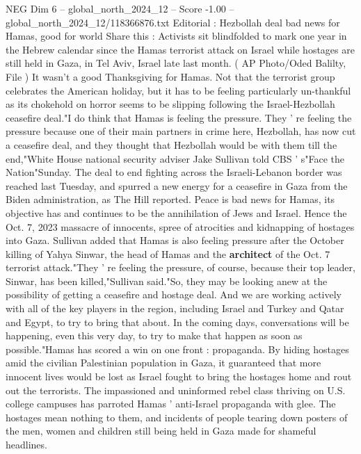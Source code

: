\begin{textsample}{NEG Dim 6 – global\_north\_2024\_12 – Score -1.00 – global\_north\_2024\_12/118366876.txt}  \label{ex:f6_neg_178}
Editorial : Hezbollah deal bad news for Hamas, good for world Share this : Activists sit blindfolded to mark one year in the Hebrew calendar since the Hamas terrorist attack on Israel while hostages are still held in Gaza, in Tel Aviv, Israel late last month. ( AP Photo/Oded Balilty, File ) It wasn't a good Thanksgiving for Hamas.
Not that the terrorist group celebrates the American holiday, but it has to be feeling particularly un-thankful as its chokehold on horror seems to be slipping following the Israel-Hezbollah ceasefire deal."I do think that Hamas is feeling the pressure.
They ' re feeling the pressure because one of their main partners in crime here, Hezbollah, has now cut a ceasefire deal, and they thought that Hezbollah would be with them till the end,"White House national security adviser Jake Sullivan told CBS ' s"Face the Nation"Sunday.
The deal to end fighting across the Israeli-Lebanon border was reached last Tuesday, and spurred a new energy for a ceasefire in Gaza from the Biden administration, as The Hill reported.
Peace is bad news for Hamas, its objective has and continues to be the annihilation of Jews and Israel.
Hence the Oct. 7, 2023 massacre of innocents, spree of atrocities and kidnapping of hostages into Gaza.
Sullivan added that Hamas is also feeling pressure after the October killing of Yahya Sinwar, the head of Hamas and the \textbf{architect} of the Oct. 7 terrorist attack."They ' re feeling the pressure, of course, because their top leader, Sinwar, has been killed,"Sullivan said."So, they may be looking anew at the possibility of getting a ceasefire and hostage deal.
And we are working actively with all of the key players in the region, including Israel and Turkey and Qatar and Egypt, to try to bring that about.
In the coming days, conversations will be happening, even this very day, to try to make that happen as soon as possible."Hamas has scored a win on one front : propaganda.
By hiding hostages amid the civilian Palestinian population in Gaza, it guaranteed that more innocent lives would be lost as Israel fought to bring the hostages home and rout out the terrorists.
The impassioned and uninformed rebel class thriving on U.S. college campuses has parroted Hamas ' anti-Israel propaganda with glee.
The hostages mean nothing to them, and incidents of people tearing down posters of the men, women and children still being held in Gaza made for shameful headlines.

\end{textsample}

